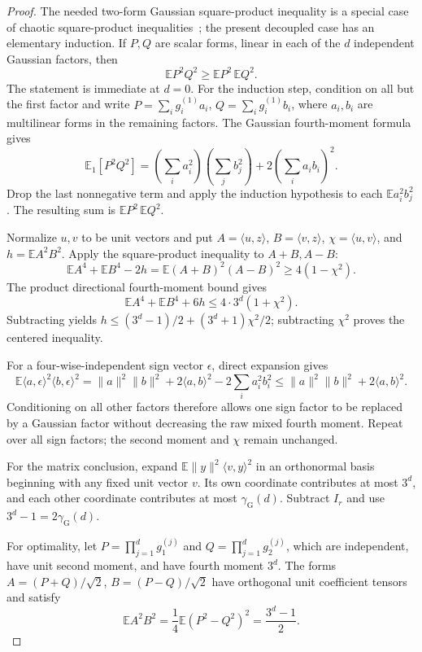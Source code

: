 \documentclass[11pt,a4paper]{article}
\theoremstyle{definition}\newtheorem{definition}[theorem]{Definition}
\theoremstyle{remark}\newtheorem{remark}[theorem]{Remark}
\numberwithin{equation}{section}
\begin{document}
\begin{proof}
The needed two-form Gaussian square-product inequality is a special
case of chaotic square-product inequalities~\cite{MNPP2015}; the present
decoupled case has an elementary induction.
If $P,Q$ are scalar forms, linear in each of the $d$ independent
Gaussian factors, then
\[
 \mathbb E P^2Q^2\ge\mathbb E P^2\,\mathbb E Q^2.
\]
The statement is immediate at $d=0$. For the induction step, condition
on all but the first factor and write $P=\sum_i g_i^{(1)}a_i$,
$Q=\sum_i g_i^{(1)}b_i$, where $a_i,b_i$ are multilinear forms in the
remaining factors. The Gaussian fourth-moment formula gives
\[
 \mathbb E_1[P^2Q^2]
 =\left(\sum_i a_i^2\right)\left(\sum_j b_j^2\right)
   +2\left(\sum_i a_ib_i\right)^2.
\]
Drop the last nonnegative term and apply the induction hypothesis to
each $\mathbb E a_i^2b_j^2$. The resulting sum is
$\mathbb E P^2\,\mathbb E Q^2$.

Normalize $u,v$ to be unit vectors and put $A=\langle u,z\rangle$,
$B=\langle v,z\rangle$, $\chi=\langle u,v\rangle$, and
$h=\mathbb E A^2B^2$. Apply the square-product inequality to $A+B,A-B$:
\[
 \mathbb E A^4+\mathbb E B^4-2h
 =\mathbb E(A+B)^2(A-B)^2\ge4(1-\chi^2).
\]
The product directional fourth-moment bound gives
\[
 \mathbb E A^4+\mathbb E B^4+6h\le4\cdot3^d(1+\chi^2).
\]
Subtracting yields
$h\le(3^d-1)/2+(3^d+1)\chi^2/2$; subtracting $\chi^2$ proves the
centered inequality.

For a four-wise-independent sign vector $\epsilon$, direct expansion gives
\[
 \mathbb E\langle a,\epsilon\rangle^2\langle b,\epsilon\rangle^2
 =\|a\|^2\|b\|^2+2\langle a,b\rangle^2-2\sum_i a_i^2b_i^2
 \le\|a\|^2\|b\|^2+2\langle a,b\rangle^2.
\]
Conditioning on all other factors therefore allows one sign factor to
be replaced by a Gaussian factor without decreasing the raw mixed
fourth moment. Repeat over all sign factors; the second moment and
$\chi$ remain unchanged.

For the matrix conclusion, expand
$\mathbb E\|y\|^2\langle v,y\rangle^2$ in an orthonormal basis beginning
with any fixed unit vector $v$. Its own coordinate contributes at most
$3^d$, and each other coordinate contributes at most
$\gamma_{\mathrm G}(d)$. Subtract $I_r$ and use
$3^d-1=2\gamma_{\mathrm G}(d)$.

For optimality, let $P=\prod_{j=1}^d g_1^{(j)}$ and
$Q=\prod_{j=1}^d g_2^{(j)}$, which are independent, have unit second
moment, and have fourth moment $3^d$. The forms
$A=(P+Q)/\sqrt2$, $B=(P-Q)/\sqrt2$ have orthogonal unit coefficient
tensors and satisfy
\[
 \mathbb E A^2B^2
 =\frac14\mathbb E(P^2-Q^2)^2
 =\frac{3^d-1}{2}.
\]
\end{proof}
\end{document}
